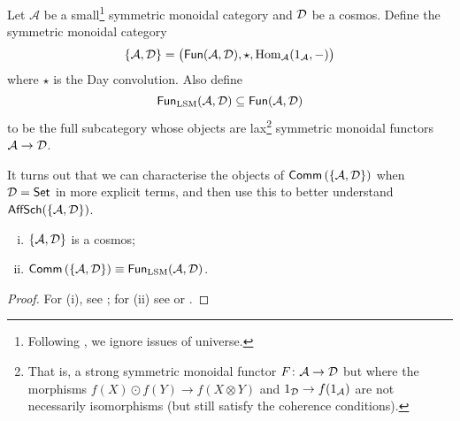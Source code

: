        \begin{definition}
            Let $\mathcal{A}$ be a small\footnote{
                Following \cite{Toen:2005wxa}, we ignore issues of universe.
            } symmetric monoidal category and $\mathcal{D}$ be a cosmos.
            Define the symmetric monoidal category
            \begin{equation*}
                \{\mathcal{A},\mathcal{D}\} = \big(\mathsf{Fun}(\mathcal{A},\mathcal{D}),\star,\operatorname{Hom}_\mathcal{A}(1_\mathcal{A},{-})\big)
            \end{equation*}
            where $\star$ is the Day convolution.
            Also define
            \begin{equation*}
                \mathsf{Fun}_{\mathrm{LSM}}(\mathcal{A},\mathcal{D}) \subseteq \mathsf{Fun}(\mathcal{A},\mathcal{D})
            \end{equation*}
            to be the full subcategory whose objects are lax\footnote{
                That is, a strong symmetric monoidal functor $F\colon\mathcal{A}\to\mathcal{D}$ but where the morphisms $f(X)\odot f(Y)\to f(X\otimes Y)$ and $1_{\mathcal{D}}\to f(1_\mathcal{A})$ are not necessarily isomorphisms (but still satisfy the coherence conditions).
            } symmetric monoidal functors \mbox{$\mathcal{A}\to\mathcal{D}$.}
        \end{definition}

        It turns out that we can characterise the objects of $\mathsf{Comm}\left({\{\mathcal{A},\mathcal{D}\}}\right)$ when $\mathcal{D}=\mathsf{Set}$ in more explicit terms, and then use this to better understand $\mathsf{AffSch}(\{\mathcal{A},\mathcal{D}\})$.

        \begin{lemma}\label{le:comm-in-psh-are-lsm}
            \mbox{}
            \vspace{-1em}
            \begin{enumerate}[(i)]
                \item $\{\mathcal{A},\mathcal{D}\}$ is a cosmos;
                \item $\mathsf{Comm}\left({\{\mathcal{A},\mathcal{D}\}}\right) \equiv \mathsf{Fun}_{\mathrm{LSM}}(\mathcal{A},\mathcal{D})$.\qedhere
            \end{enumerate}
        \end{lemma}

        \begin{proof}
            For (i), see \cite{Anonymous:QU19aScS}; for (ii) see \cite[Example~3.2.2]{Day:ve} or \cite[Proposition~22.1]{Anonymous:czsXyaOO}.
        \end{proof}

